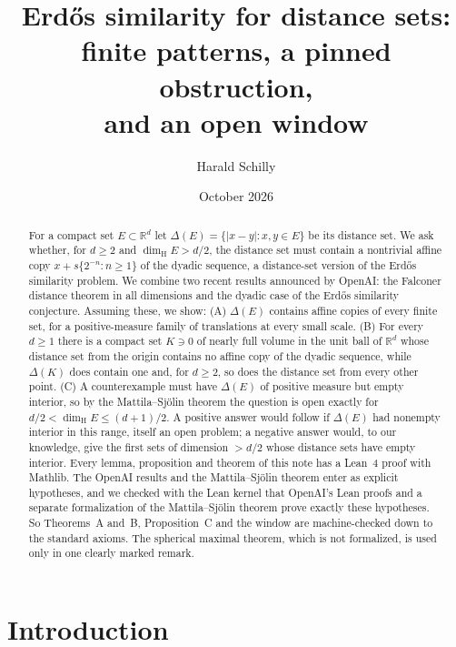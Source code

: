 \documentclass[11pt]{amsart}
\title[Erd\H{o}s similarity for distance sets]{Erd\H{o}s similarity for distance sets:\\
finite patterns, a pinned obstruction,\\ and an open window}
\author{Harald Schilly}
\date{October 2026}
\theoremstyle{definition}
\theoremstyle{remark}
\newcommand{\R}{\mathbb{R}}
\newcommand{\dimH}{\dim_{\mathrm H}}
\begin{document}
\begin{abstract}
For a compact set $E\subset\R^d$ let $\Delta(E)=\{|x-y|:x,y\in E\}$ be its distance set. We ask
whether, for $d\ge2$ and $\dimH E>d/2$, the distance set must contain a nontrivial affine copy
$x+s\{2^{-n}:n\ge1\}$ of the dyadic sequence, a distance-set version of the Erd\H{o}s similarity
problem. We combine two recent results announced by OpenAI: the Falconer distance theorem in all
dimensions and the dyadic case of the Erd\H{o}s similarity conjecture. Assuming these, we show:
(A) $\Delta(E)$ contains affine copies of every finite set, for a positive-measure family of
translations at every small scale. (B) For every $d\ge1$ there is a compact set $K\ni0$ of nearly
full volume in the unit ball of $\R^d$ whose distance set from the origin contains no affine copy of
the dyadic sequence, while $\Delta(K)$ does contain one and, for $d\ge2$, so does the distance set
from every other point. (C) A counterexample must have $\Delta(E)$ of positive measure but empty
interior, so by the Mattila--Sj\"olin theorem the question is open exactly for
$d/2<\dimH E\le(d+1)/2$. A positive answer would follow if $\Delta(E)$ had nonempty interior in
this range, itself an open problem; a negative answer would, to our knowledge, give the first sets of
dimension $>d/2$ whose distance sets have empty interior. Every lemma, proposition and theorem of this note
has a Lean~4 proof with Mathlib. The OpenAI results and the Mattila--Sj\"olin theorem enter as
explicit hypotheses, and we checked with the Lean kernel that OpenAI's Lean proofs and a separate
formalization of the Mattila--Sj\"olin theorem prove exactly these hypotheses. So Theorems~A
and~B, Proposition~C and the window are machine-checked down to the standard axioms. The spherical
maximal theorem, which is not formalized, is used only in one clearly marked remark.
\end{abstract}


\maketitle

\section{Introduction}
\end{document}
